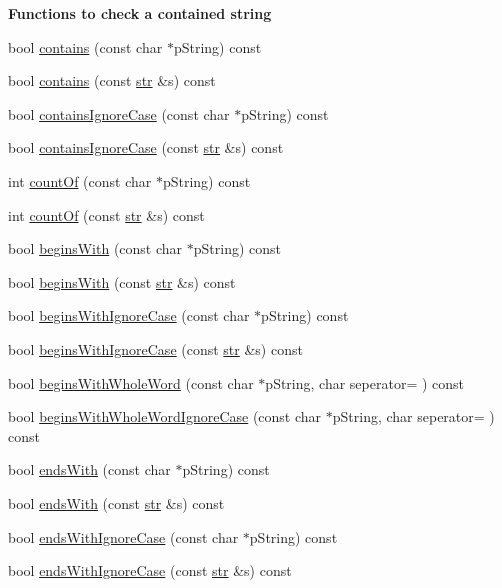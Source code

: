 \begin{Indent}{\bf Functions to check a contained string}\par
\begin{DoxyCompactItemize}
\item 
bool \hyperlink{classstr_a2c1bf8e6c10ecd130f24d7d26ccf0f81}{contains} (const char $\ast$p\+String) const 
\item 
bool \hyperlink{classstr_ae5cc223e5fd9e9d03c3dc1e6064a845c}{contains} (const \hyperlink{classstr}{str} \&s) const 
\item 
bool \hyperlink{classstr_ae4f9c0c01233b57385f6a448b7708783}{contains\+Ignore\+Case} (const char $\ast$p\+String) const 
\item 
bool \hyperlink{classstr_a0f18be2447e595472f5b34b5329ec61a}{contains\+Ignore\+Case} (const \hyperlink{classstr}{str} \&s) const 
\item 
int \hyperlink{classstr_aaa38a7cd7e57bbed410d302e4ec9f124}{count\+Of} (const char $\ast$p\+String) const 
\item 
int \hyperlink{classstr_a4f221d9c917d95b62f3e958bbea17485}{count\+Of} (const \hyperlink{classstr}{str} \&s) const 
\item 
bool \hyperlink{classstr_a66222ee89b9ac835be8dc9774c541123}{begins\+With} (const char $\ast$p\+String) const 
\item 
bool \hyperlink{classstr_ab39a7adca1baf829a0649bf3aa37d6db}{begins\+With} (const \hyperlink{classstr}{str} \&s) const 
\item 
bool \hyperlink{classstr_aa7284f785af8aa595921cd2aa0d86305}{begins\+With\+Ignore\+Case} (const char $\ast$p\+String) const 
\item 
bool \hyperlink{classstr_a20909c6794180d22264d1b7d0d759a1a}{begins\+With\+Ignore\+Case} (const \hyperlink{classstr}{str} \&s) const 
\item 
bool \hyperlink{classstr_a3120202e47bd08635008f1d21e731498}{begins\+With\+Whole\+Word} (const char $\ast$p\+String, char seperator=\textquotesingle{} \textquotesingle{}) const 
\item 
bool \hyperlink{classstr_a3c86eeedc44bcf13688d5d6d509a8e84}{begins\+With\+Whole\+Word\+Ignore\+Case} (const char $\ast$p\+String, char seperator=\textquotesingle{} \textquotesingle{}) const 
\item 
bool \hyperlink{classstr_a6c36bc68752467983e2ed0a9d6f9f422}{ends\+With} (const char $\ast$p\+String) const 
\item 
bool \hyperlink{classstr_afad629ef65f0066f0a9b4907ccaa8b10}{ends\+With} (const \hyperlink{classstr}{str} \&s) const 
\item 
bool \hyperlink{classstr_ae2c11acd63b22b4b56c6cb572f6b34a6}{ends\+With\+Ignore\+Case} (const char $\ast$p\+String) const 
\item 
bool \hyperlink{classstr_a05d82df249072846752cd4350c448f81}{ends\+With\+Ignore\+Case} (const \hyperlink{classstr}{str} \&s) const 
\end{DoxyCompactItemize}
\end{Indent}
